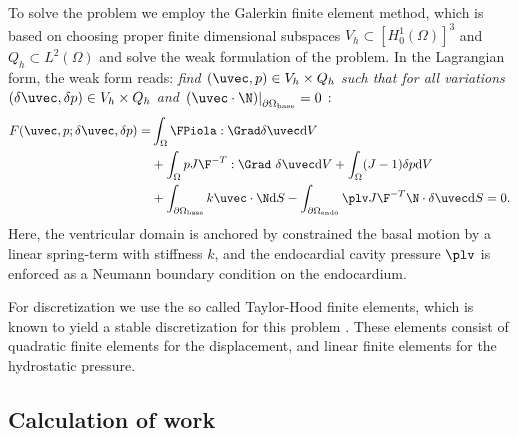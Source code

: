 To solve the problem we employ the Galerkin finite element method, which is based
on choosing proper finite dimensional subspaces $V_h \subset [H_0^1(\Omega)]^3$ and
$Q_h \subset L^2(\Omega)$ and solve the weak formulation of the problem. In
the Lagrangian form, the weak form reads: {\it find $(\uvec,p)
\in V_h\times Q_h$ such that for all variations $(\delta
\uvec, \delta p) \in V_h \times Q_h $ and $\left. \left( \uvec \cdot \N \right)
\right|_{\partial \Omega_{\mathrm{base}}} = 0$ }:
\begin{align}
\begin{split}
  F(\uvec, p;\delta \uvec, \delta p) =
  &\int_{\Omega} \FPiola :  \Grad \delta \uvec  \mathrm{d} V  \\
  &+\int_{\Omega} p J \F^{-T} : \Grad \ \delta \uvec   \mathrm{d} V  
  +\int_{\Omega} (J - 1) \delta p \mathrm{d} V \\
  &+\int_{\partial \Omega_{\text{base}}} k \uvec \cdot \N \mathrm{d}S
  - \int_{\partial \Omega_{\text{endo}}} \plv J \F^{-T} \N \cdot \delta \uvec \mathrm{d}S= 0.
  \label{eq:force_balance}
\end{split}
\end{align}
Here, the ventricular domain is anchored by constrained the basal
motion by a linear spring-term with stiffness $k$, and the
endocardial cavity pressure $\plv$ is enforced as a Neumann boundary
condition on the endocardium.  

For discretization we use the so called Taylor-Hood finite elements,
which is known to yield a stable discretization for this problem
\cite{arnold1984stable}. These elements consist of quadratic finite
elements for the displacement, and linear finite elements for
the hydrostatic pressure. 



\subsection{Calculation of work}
\label{sec:regional_work}

